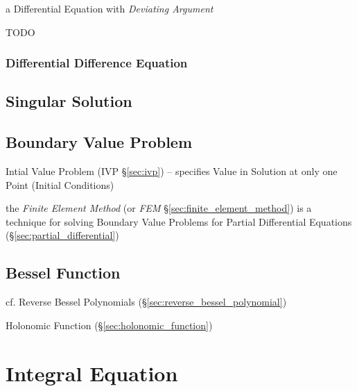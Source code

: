 a Differential Equation with \emph{Deviating Argument}

TODO



\subsubsection{Differential Difference Equation}\label{sec:dde}



\subsection{Singular Solution}\label{sec:singular_solution}

\subsection{Boundary Value Problem}\label{sec:boundary_value_problem}


\fist Intial Value Problem (IVP \S\ref{sec:ivp}) -- specifies Value in Solution
at only one Point (Initial Conditions)


\fist the \emph{Finite Element Method} (or \emph{FEM}
\S\ref{sec:finite_element_method}) is a technique for solving Boundary Value
Problems for Partial Differential Equations (\S\ref{sec:partial_differential})



\subsection{Bessel Function}\label{sec:bessel_function}

cf. Reverse Bessel Polynomials (\S\ref{sec:reverse_bessel_polynomial})

\fist Holonomic Function (\S\ref{sec:holonomic_function})



\section{Integral Equation}\label{sec:integral_equation}

